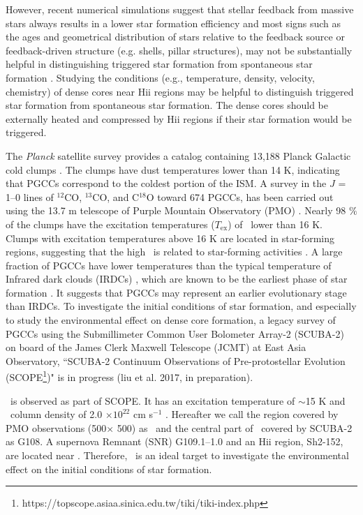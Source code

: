 \documentclass[manuscript]{aastex}
\begin{document}
However, recent numerical simulations suggest that stellar feedback from massive stars always results
in a lower star formation efficiency and most signs such as the ages and geometrical distribution of stars relative to the feedback
source or feedback-driven structure (e.g. shells, pillar structures), may not be substantially helpful in distinguishing triggered star formation from spontaneous star formation \citep{dale12,dale15}.  
Studying the conditions (e.g., temperature, density, velocity, chemistry) of dense cores near H{\sc ii} regions may be helpful to distinguish triggered star formation from spontaneous star formation. 
The dense cores should be externally heated and compressed by H{\sc ii} regions if their star formation would be triggered.


The \textit{Planck} satellite survey provides a catalog containing 13,188 Planck Galactic cold clumps \citep[PGCCs;][]{planck15}.
The clumps have dust temperatures lower than 14 K, indicating that PGCCs correspond to the coldest portion of the ISM.
A survey in the $J$ = 1--0 lines of $^{12}$CO, $^{13}$CO, and C$^{18}$O toward 674 PGCCs, has been carried out using the 13.7 m telescope of Purple Mountain Observatory (PMO) \citep{wu12,liu13,zhang16}.
Nearly 98 $\%$ of the clumps have the excitation temperatures ($T_{\textrm{ex}}$) of \tco\ lower than 16 K.
Clumps with excitation temperatures above 16 K are located in star-forming regions, suggesting that the high \tex\ is related to star-forming activities \citep{wu12}.
A large fraction of PGCCs have lower temperatures than the typical temperature of Infrared dark clouds (IRDCs) \citep[15 K;][]{pillai06}, which are known to be the earliest phase of star formation \citep{carey98,simon06}.
It suggests that PGCCs may represent an earlier evolutionary stage than IRDCs.
To investigate the initial conditions of star formation, and especially to study the environmental effect on dense core formation, a legacy survey of PGCCs using the Submillimeter Common User Bolometer Array-2 (SCUBA-2) on board of the James Clerk Maxwell Telescope (JCMT) at East Asia Observatory, ``SCUBA-2 Continuum Observations of Pre-protostellar Evolution (SCOPE\footnote{https://topscope.asiaa.sinica.edu.tw/tiki/tiki-index.php})" is in progress (liu et al. 2017, in preparation).


\sou\ is observed as part of SCOPE.
It has an excitation temperature of $\sim$15 K and \atomh\ column density of 2.0 $\times 10^{22}$ cm s$^{-1}$ \citep{wu12}.
Hereafter we call the region covered by PMO observations (500\arcsec $\times$ 500\arcsec) as \sou\ and the central part of \sou\ covered by SCUBA-2 as G108.
A supernova Remnant (SNR) G109.1--1.0 and an H{\sc ii} region, Sh2-152, are located near \sou. 
Therefore, \sou\ is an ideal target to investigate the environmental effect on the initial conditions of star formation.
\end{document}
